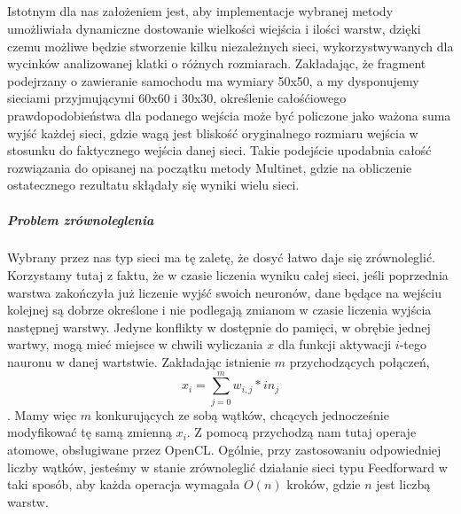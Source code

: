 \documentclass{article}
\begin{document}
\subparagraph{} Istotnym dla nas założeniem jest, aby implementacje wybranej metody umożliwiała dynamiczne dostowanie wielkości wiejścia i ilości warstw, dzięki czemu możliwe będzie stworzenie kilku niezależnych sieci, wykorzystwywanych dla wycinków analizowanej klatki o różnych rozmiarach. Zakładając, że fragment podejrzany o zawieranie samochodu ma wymiary 50x50, a my dysponujemy sieciami przyjmującymi 60x60 i 30x30, określenie całośćiowego prawdopodobieństwa dla podanego wejścia może być policzone jako ważona suma wyjść każdej sieci, gdzie wagą jest bliskość oryginalnego rozmiaru wejścia w stosunku do faktycznego wejścia danej sieci. Takie podejście upodabnia całość rozwiązania do opisanej na początku metody Multinet, gdzie na obliczenie ostatecznego rezultatu skłądały się wyniki wielu sieci.

\subparagraph{Problem zrównoleglenia} Wybrany przez nas typ sieci ma tę zaletę, że dosyć łatwo daje się zrównoleglić. Korzystamy tutaj z faktu, że w czasie liczenia wyniku całej sieci, jeśli poprzednia warstwa zakończyła już liczenie wyjść swoich neuronów, dane będące na wejściu kolejnej są dobrze określone i nie podlegają zmianom w czasie liczenia wyjścia następnej warstwy. Jedyne konflikty w dostępnie do pamięci, w obrębie jednej wartwy, mogą mieć miejsce w chwili wyliczania $x$ dla funkcji aktywacji $i$-tego nauronu w danej wartstwie. Zakładając istnienie $m$ przychodzących połączeń, \[x_i = \sum _{j=0}^{m}w_{i,j}*in_j\]. Mamy więc $m$ konkurujących ze sobą wątków, chcących jednocześnie modyfikować tę samą zmienną $x_i$. Z pomocą przychodzą nam tutaj operaje atomowe, obsługiwane przez OpenCL. Ogólnie, przy zastosowaniu odpowiedniej liczby wątków, jesteśmy w stanie zrównoleglić działanie sieci typu Feedforward w taki sposób, aby każda operacja wymagała $O(n)$ kroków, gdzie $n$ jest liczbą warstw.


\newpage
\listoffigures
\end{document}

